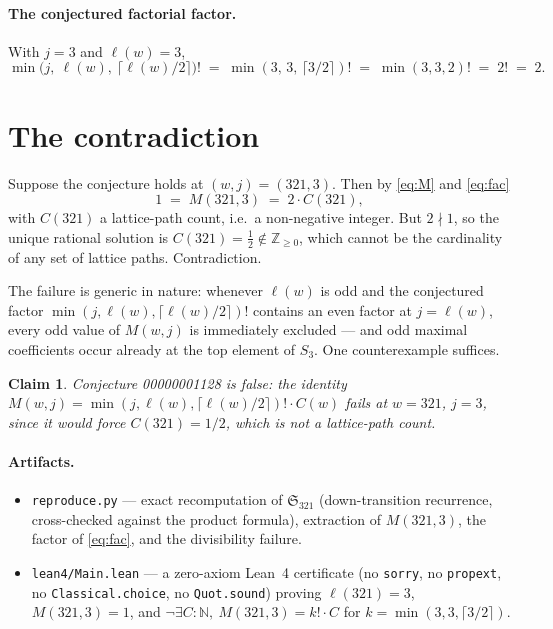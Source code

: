 \documentclass[11pt]{article}
\newtheorem*{claim}{Claim}
\newcommand{\Sch}{\mathfrak{S}}
\newcommand{\lcm}{\ell}
\begin{document}
\paragraph{The conjectured factorial factor.}
With $j = 3$ and $\lcm(w) = 3$,
\begin{equation}
\min\bigl(j,\ \lcm(w),\ \lceil \lcm(w)/2 \rceil\bigr)!
\;=\; \min(3,\,3,\,\lceil 3/2 \rceil)!
\;=\; \min(3,3,2)!
\;=\; 2!\;=\;2. \label{eq:fac}
\end{equation}

\section{The contradiction}

Suppose the conjecture holds at $(w,j) = (321,3)$. Then by \eqref{eq:M} and \eqref{eq:fac}
\[
1 \;=\; M(321,3) \;=\; 2 \cdot C(321),
\]
with $C(321)$ a lattice-path count, i.e.\ a non-negative integer. But $2 \nmid 1$, so the
unique rational solution is $C(321) = \tfrac12 \notin \mathbb{Z}_{\ge 0}$, which cannot be
the cardinality of any set of lattice paths. Contradiction.

The failure is generic in nature: whenever $\lcm(w)$ is odd and the conjectured factor
$\min(j,\lcm(w),\lceil \lcm(w)/2 \rceil)!$ contains an even factor at $j = \lcm(w)$, every
odd value of $M(w,j)$ is immediately excluded --- and odd maximal coefficients occur
already at the top element of $S_3$. One counterexample suffices.

\begin{claim}
Conjecture 00000001128 is false: the identity
$M(w,j) = \min(j,\lcm(w),\lceil \lcm(w)/2\rceil)! \cdot C(w)$ fails at $w = 321$,
$j = 3$, since it would force $C(321) = 1/2$, which is not a lattice-path count.
\end{claim}

\paragraph{Artifacts.}
\begin{itemize}
  \item \texttt{reproduce.py} --- exact recomputation of $\Sch_{321}$ (down-transition
        recurrence, cross-checked against the product formula), extraction of $M(321,3)$,
        the factor of \eqref{eq:fac}, and the divisibility failure.
  \item \texttt{lean4/Main.lean} --- a zero-axiom Lean~4 certificate (no \texttt{sorry},
        no \texttt{propext}, no \texttt{Classical.choice}, no \texttt{Quot.sound}) proving
        $\lcm(321) = 3$, $M(321,3) = 1$, and
        $\neg \exists C : \mathbb{N},\ M(321,3) = k! \cdot C$ for
        $k = \min(3,3,\lceil 3/2 \rceil)$.
\end{itemize}
\end{document}

